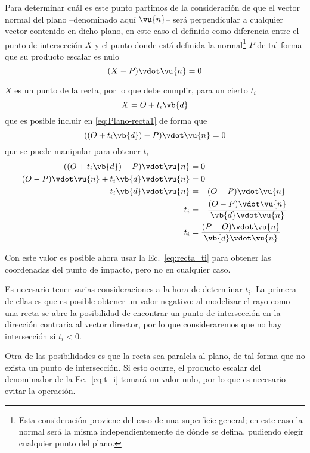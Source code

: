 Para determinar cuál es este punto partimos de la consideración de que el vector normal del plano --denominado aquí $\vu{n}$-- será perpendicular a cualquier vector contenido en dicho plano, en este caso el definido como diferencia entre el punto de intersección $X$ y el punto donde está definida la normal\footnote{Esta consideración proviene del caso de una superficie general; en este caso la normal será la misma independientemente de dónde se defina, pudiendo elegir cualquier punto del plano.} $P$ de tal forma que su producto escalar es nulo
\begin{equation}\label{eq:Plano-recta1}
    (X-P)\vdot\vu{n} = 0
\end{equation}

$X$ es un punto de la recta, por lo que debe cumplir, para un cierto $t_i$
\begin{equation}\label{eq:recta_ti}
    X = O + t_i\vb{d}
\end{equation}
que es posible incluir en \eqref{eq:Plano-recta1} de forma que
\begin{equation}
    ((O + t_i\vb{d})-P)\vdot\vu{n} = 0
\end{equation}
que se puede manipular para obtener $t_i$
\begin{equation}\label{eq:t_i}
    \begin{aligned}
        ((O + t_i\vb{d})-P)\vdot\vu{n} &= 0 \\
        (O - P)\vdot\vu{n} + t_i\vb{d}\vdot\vu{n}  &= 0 \\
        t_i\vb{d}\vdot\vu{n} &= - (O - P)\vdot\vu{n}\\
        t_i &= -\frac{(O - P)\vdot\vu{n}}{\vb{d}\vdot\vu{n}}\\
        t_i &= \frac{(P-O)\vdot\vu{n}}{\vb{d}\vdot\vu{n}}
    \end{aligned}
\end{equation}

Con este valor es posible ahora usar la Ec.~\eqref{eq:recta_ti} para obtener las coordenadas del punto de impacto, pero no en cualquier caso.

Es necesario tener varias consideraciones a la hora de determinar $t_i$.
La primera de ellas es que es posible obtener un valor negativo: al modelizar el rayo como una recta se abre la posibilidad de encontrar un punto de intersección en la dirección contraria al vector director, por lo que consideraremos que no hay intersección si $t_i < 0$.

Otra de las posibilidades es que la recta sea paralela al plano, de tal forma que no exista un punto de intersección.
Si esto ocurre, el producto escalar del denominador de la Ec.~\eqref{eq:t_i} tomará un valor nulo, por lo que es necesario evitar la operación.

